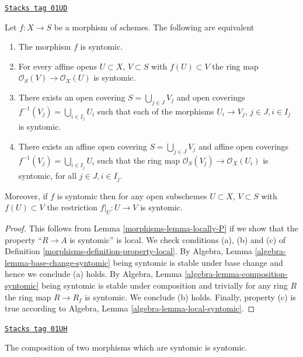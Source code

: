 \begin{lemma}
\label{morphisms-lemma-syntomic-characterize}
\href{https://stacks.math.columbia.edu/tag/01UD}{\texttt{Stacks tag 01UD}}

Let $f : X \to S$ be a morphism of schemes.
The following are equivalent
\begin{enumerate}
\item The morphism $f$ is syntomic.
\item For every affine opens $U \subset X$, $V \subset S$
with $f(U) \subset V$ the ring map
$\mathcal{O}_S(V) \to \mathcal{O}_X(U)$ is syntomic.
\item There exists an open covering $S = \bigcup_{j \in J} V_j$
and open coverings $f^{-1}(V_j) = \bigcup_{i \in I_j} U_i$ such
that each of the morphisms $U_i \to V_j$, $j\in J, i\in I_j$
is syntomic.
\item There exists an affine open covering $S = \bigcup_{j \in J} V_j$
and affine open coverings $f^{-1}(V_j) = \bigcup_{i \in I_j} U_i$ such
that the ring map $\mathcal{O}_S(V_j) \to \mathcal{O}_X(U_i)$ is
syntomic, for all $j\in J, i\in I_j$.
\end{enumerate}
Moreover, if $f$ is syntomic then for
any open subschemes $U \subset X$, $V \subset S$ with $f(U) \subset V$
the restriction $f|_U : U \to V$ is syntomic.
\end{lemma}

\begin{proof}

This follows from Lemma \ref{morphisms-lemma-locally-P} if we show that
the property ``$R \to A$ is syntomic'' is local.
We check conditions (a), (b) and (c) of Definition
\ref{morphisms-definition-property-local}.
By Algebra, Lemma \ref{algebra-lemma-base-change-syntomic}
being syntomic is stable under base change and hence
we conclude (a) holds. By
Algebra, Lemma \ref{algebra-lemma-composition-syntomic}
being syntomic is stable under composition and trivially for any ring
$R$ the ring map $R \to R_f$ is syntomic.
We conclude (b) holds. Finally, property (c) is true
according to Algebra, Lemma \ref{algebra-lemma-local-syntomic}.
\end{proof}

\begin{lemma}
\label{morphisms-lemma-composition-syntomic}
\href{https://stacks.math.columbia.edu/tag/01UH}{\texttt{Stacks tag 01UH}}

The composition of two morphisms which are syntomic is syntomic.
\end{lemma}

